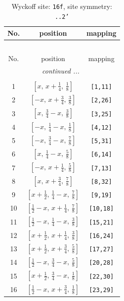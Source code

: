 \documentclass[fleqn,8pt]{jsarticle}
\begin{document}
\renewcommand{\arraystretch}{1.2}
\begin{longtable}{ccc}
\caption{Wyckoff site: {\tt 16f}, site symmetry: {\tt ..2'}}
 \\
 \hline \hline
No. & position & mapping \\ \hline \endfirsthead

\multicolumn{2}{l}{\tablename\ \thetable{}} \\
 \hline \hline
No. & position & mapping \\ \hline \endhead

 \hline \hline
\multicolumn{2}{r}{\footnotesize\it continued ...} \\ \endfoot

 \hline \hline
\multicolumn{2}{r}{} \\ \endlastfoot

1 & $\left[ x,\, x + \frac{1}{4},\, \frac{1}{8} \right]$ & {\tt [1,11]} \\ \hline
2 & $\left[ - x,\, x + \frac{3}{4},\, \frac{3}{8} \right]$ & {\tt [2,26]} \\ \hline
3 & $\left[ x,\, \frac{3}{4} - x,\, \frac{3}{8} \right]$ & {\tt [3,25]} \\ \hline
4 & $\left[ - x,\, \frac{1}{4} - x,\, \frac{1}{8} \right]$ & {\tt [4,12]} \\ \hline
5 & $\left[ - x,\, \frac{3}{4} - x,\, \frac{7}{8} \right]$ & {\tt [5,31]} \\ \hline
6 & $\left[ x,\, \frac{1}{4} - x,\, \frac{5}{8} \right]$ & {\tt [6,14]} \\ \hline
7 & $\left[ - x,\, x + \frac{1}{4},\, \frac{5}{8} \right]$ & {\tt [7,13]} \\ \hline
8 & $\left[ x,\, x + \frac{3}{4},\, \frac{7}{8} \right]$ & {\tt [8,32]} \\ \hline
9 & $\left[ x + \frac{1}{2},\, \frac{1}{4} - x,\, \frac{7}{8} \right]$ & {\tt [9,19]} \\ \hline
10 & $\left[ \frac{1}{2} - x,\, x + \frac{1}{4},\, \frac{7}{8} \right]$ & {\tt [10,18]} \\ \hline
11 & $\left[ \frac{1}{2} - x,\, \frac{1}{4} - x,\, \frac{3}{8} \right]$ & {\tt [15,21]} \\ \hline
12 & $\left[ x + \frac{1}{2},\, x + \frac{1}{4},\, \frac{3}{8} \right]$ & {\tt [16,24]} \\ \hline
13 & $\left[ x + \frac{1}{2},\, x + \frac{3}{4},\, \frac{5}{8} \right]$ & {\tt [17,27]} \\ \hline
14 & $\left[ \frac{1}{2} - x,\, \frac{3}{4} - x,\, \frac{5}{8} \right]$ & {\tt [20,28]} \\ \hline
15 & $\left[ x + \frac{1}{2},\, \frac{3}{4} - x,\, \frac{1}{8} \right]$ & {\tt [22,30]} \\ \hline
16 & $\left[ \frac{1}{2} - x,\, x + \frac{3}{4},\, \frac{1}{8} \right]$ & {\tt [23,29]} \\
\end{longtable}
\end{document}
